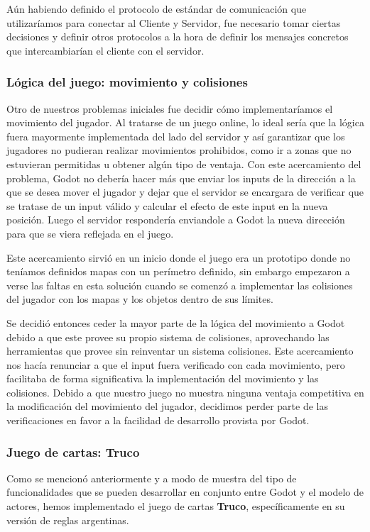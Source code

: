\noindent Aún habiendo definido el protocolo de estándar de comunicación que utilizaríamos para conectar al Cliente y Servidor,
fue necesario tomar ciertas decisiones y definir otros protocolos a la hora de definir los mensajes
concretos que intercambiarían el cliente con el servidor.

\subsubsection{Lógica del juego: movimiento y colisiones}
\noindent Otro de nuestros problemas iniciales fue decidir cómo implementaríamos el movimiento del 
jugador. Al tratarse de un juego online, lo ideal sería que la lógica fuera mayormente implementada del 
lado del servidor y así garantizar que los jugadores no pudieran realizar movimientos prohibidos, como 
ir a zonas que no estuvieran permitidas u obtener algún tipo de ventaja. Con este acercamiento del 
problema, Godot no debería hacer más que enviar los inputs de la dirección a la que se desea mover el 
jugador y dejar que el servidor se encargara de verificar que se tratase de un input válido y calcular 
el efecto de este input en la nueva posición. Luego el servidor respondería enviandole a Godot la nueva
dirección para que se viera reflejada en el juego.

Este acercamiento sirvió en un inicio donde el juego era un prototipo donde no teníamos definidos 
mapas con un perímetro definido, sin embargo empezaron a verse las faltas en esta solución cuando 
se comenzó a implementar las colisiones del jugador con los mapas y los objetos dentro de sus límites.

Se decidió entonces ceder la mayor parte de la lógica del movimiento a Godot debido a que este provee 
su propio sistema de colisiones, aprovechando las herramientas que provee sin reinventar un sistema 
colisiones. Este acercamiento nos hacía renunciar a que el input fuera 
verificado con cada movimiento, pero facilitaba de forma significativa la implementación del 
movimiento y las colisiones. Debido a que nuestro juego no muestra ninguna ventaja competitiva 
en la modificación del movimiento del jugador, decidimos perder parte de las verificaciones en 
favor a la facilidad de desarrollo provista por Godot.


\subsubsection{Juego de cartas: Truco}
\noindent Como se mencionó anteriormente y a modo de muestra del tipo de funcionalidades que se pueden
desarrollar en conjunto entre Godot y el modelo de actores, hemos implementado el juego de cartas \textbf{Truco},
específicamente en su versión de reglas argentinas.

